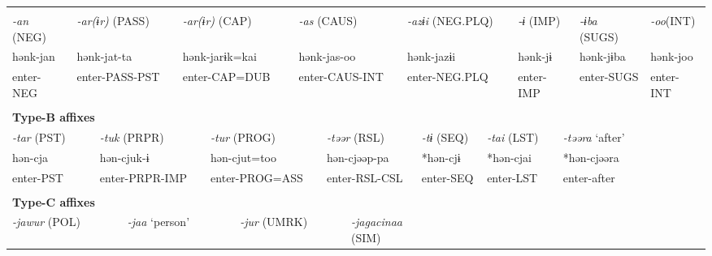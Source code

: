 \tabletail{}
\tablelasttail{}
\begin{tabularx}{\textwidth}{XXXXXXXXXXXXXXXXXXXXXX}
\lsptoprule
\multicolumn{22}{X}{{\bfseries Type-A affixes}}\\
{ \textit{{}-an} (NEG)} & \multicolumn{4}{X}{{ \textit{{}-ar(ɨr)} (PASS)}} & \multicolumn{4}{X}{{ \textit{{}-ar(ɨr)} (CAP)}} & \multicolumn{4}{X}{{ \textit{{}-as} (CAUS)}} & \multicolumn{5}{X}{{ \textit{{}-azɨi} (NEG.PLQ)}} & \multicolumn{2}{X}{{ \textit{{}-ɨ} (IMP)}} & { \textit{{}-ɨba} (SUGS)} & { \textit{{}-oo}(INT)}\\
hənk-jan & \multicolumn{4}{X}{hənk-jat-ta} & \multicolumn{4}{X}{hənk-jarɨk=kai} & \multicolumn{4}{X}{hənk-jas-oo} & \multicolumn{5}{X}{hənk-jazɨi} & \multicolumn{2}{X}{hənk-jɨ} & hənk-jɨba & hənk-joo\\
enter-NEG & \multicolumn{4}{X}{enter-PASS-PST} & \multicolumn{4}{X}{enter-CAP=DUB} & \multicolumn{4}{X}{enter-CAUS-INT} & \multicolumn{5}{X}{enter-NEG.PLQ} & \multicolumn{2}{X}{enter-IMP} & enter-SUGS & enter-INT\\
\multicolumn{22}{X}{}\\
\multicolumn{22}{X}{{\bfseries Type-B affixes}}\\
\multicolumn{2}{X}{{ \textit{{}-tar} (PST)}} & \multicolumn{4}{X}{{ \textit{{}-tuk} (PRPR)}} & \multicolumn{4}{X}{{ \textit{{}-tur} (PROG)}} & \multicolumn{4}{X}{{ \textit{{}-təər} (RSL)}} & \multicolumn{3}{X}{{ \textit{{}-tɨ} (SEQ)}} & \multicolumn{2}{X}{{ \textit{{}-tai} (LST)}} & \multicolumn{3}{X}{{ \textit{{}-təəra} ‘after’}}\\
\multicolumn{2}{X}{{ hən-cja}} & \multicolumn{4}{X}{{ hən-cjuk-ɨ}} & \multicolumn{4}{X}{{ hən-cjut=too}} & \multicolumn{4}{X}{{ hən-cjəəp-pa}} & \multicolumn{3}{X}{{ *hən-cjɨ}} & \multicolumn{2}{X}{{ *hən-cjai}} & \multicolumn{3}{X}{{ *hən-cjəəra}}\\
\multicolumn{2}{X}{enter-PST} & \multicolumn{4}{X}{enter-PRPR-IMP} & \multicolumn{4}{X}{enter-PROG=ASS} & \multicolumn{4}{X}{enter-RSL-CSL} & \multicolumn{3}{X}{enter-SEQ} & \multicolumn{2}{X}{enter-LST} & \multicolumn{3}{X}{{ enter-after}}\\
\multicolumn{2}{X}{} & \multicolumn{4}{X}{} & \multicolumn{4}{X}{} & \multicolumn{4}{X}{} & \multicolumn{3}{X}{} & \multicolumn{2}{X}{} & \multicolumn{3}{X}{}\\
\multicolumn{22}{X}{{\bfseries Type-C affixes}}\\
\multicolumn{3}{X}{{ \textit{{}-jawur} (POL)}} & \multicolumn{4}{X}{{ \textit{{}-jaa} ‘person’}} & \multicolumn{4}{X}{{ \textit{{}-jur} (UMRK)}} & \multicolumn{4}{X}{{ \textit{{}-jagacinaa} (SIM)}} & \multicolumn{7}{X}{}\\

\end{tabularx}
